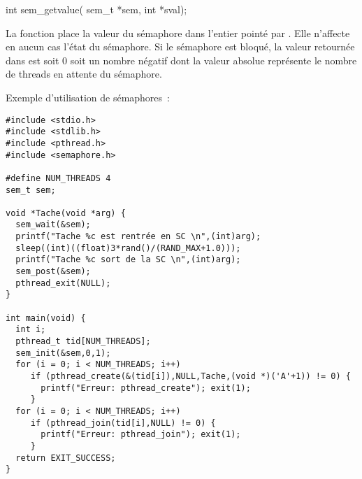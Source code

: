 \begin{codeblock}
int sem_getvalue(
    sem_t *sem,
    int *sval);
\end{codeblock}

La fonction  place la valeur du sémaphore dans l'entier pointé par . Elle n'affecte en aucun cas l'état du sémaphore. Si le sémaphore est bloqué, la valeur retournée dans  est soit 0 soit un nombre négatif dont la valeur absolue représente le nombre de threads en attente du sémaphore.

Exemple d'utilisation de sémaphores~:

\begin{lstlisting}
#include <stdio.h>
#include <stdlib.h>
#include <pthread.h>
#include <semaphore.h>

#define NUM_THREADS 4
sem_t sem;

void *Tache(void *arg) {
  sem_wait(&sem);
  printf("Tache %c est rentrée en SC \n",(int)arg);
  sleep((int)((float)3*rand()/(RAND_MAX+1.0)));
  printf("Tache %c sort de la SC \n",(int)arg);
  sem_post(&sem);
  pthread_exit(NULL);
}

int main(void) {
  int i;
  pthread_t tid[NUM_THREADS];
  sem_init(&sem,0,1);
  for (i = 0; i < NUM_THREADS; i++)
     if (pthread_create(&(tid[i]),NULL,Tache,(void *)('A'+1)) != 0) {
       printf("Erreur: pthread_create"); exit(1);
     }
  for (i = 0; i < NUM_THREADS; i++)
     if (pthread_join(tid[i],NULL) != 0) {
       printf("Erreur: pthread_join"); exit(1);
     }
  return EXIT_SUCCESS;
}
\end{lstlisting}
